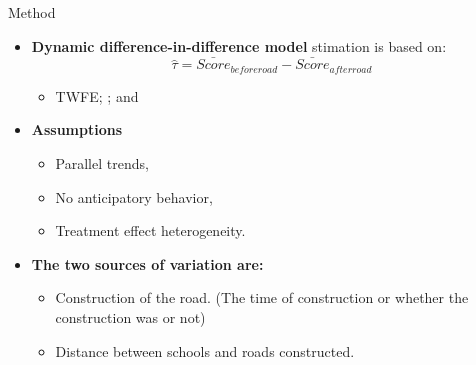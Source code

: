 \documentclass[9pt]{beamer}
\begin{document}



\begin{frame}{Method}

\begin{itemize}
   
\item \textbf{Dynamic difference-in-difference model} stimation is based on:
\\
$$\hat{\tau} = \bar{Score}_{before road} - \bar{Score}_{after road}$$
    \begin{itemize}
        \item TWFE; \cite{CALLAWAY2021200}; and    \cite{SUN2021175}
    \end{itemize}
\small
 

\item \textbf{Assumptions  \cite{SUN2021175}}
      \begin{itemize}
            \item Parallel trends,
            \item No anticipatory behavior, 
            \item Treatment effect heterogeneity.  
    \end{itemize}

\item \textbf{ The two sources of variation are:}        
        
    \begin{itemize}
        \item Construction of the road. (The time of construction or whether the construction was or not)
        
        \item  Distance between schools and roads constructed. 
    \end{itemize}

\end{itemize}

\end{frame}

\end{document}
